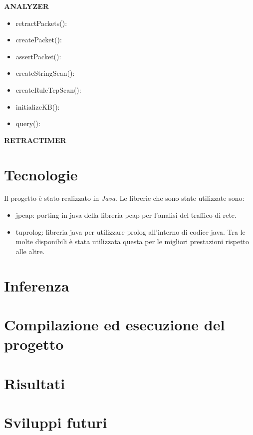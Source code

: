 \documentclass[a4paper,12pt]{article} %
\begin{document}
\textbf{ANALYZER}



\begin{itemize}

\item retractPackets():

\item createPacket():

\item assertPacket():

\item createStringScan():

\item createRuleTcpScan():

\item initializeKB():

\item query():
\end{itemize}

\textbf{RETRACTIMER}



\section{Tecnologie}

Il progetto è stato realizzato in \emph{Java}. Le librerie che sono state utilizzate sono:


\begin{itemize}

\item jpcap: porting in java della libreria pcap per l'analisi del traffico di rete.

\item tuprolog: libreria java per utilizzare prolog all'interno di codice java. Tra le molte disponibili
è stata utilizzata questa per le migliori prestazioni rispetto alle altre.

\end{itemize}


\section{Inferenza}



\section{Compilazione ed esecuzione del progetto}



\section{Risultati}



\section{Sviluppi futuri}
\end{document}
